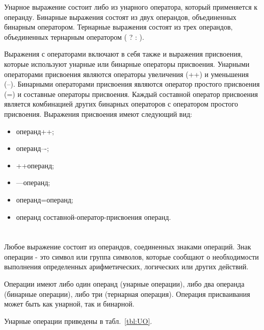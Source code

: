 Унарное выражение состоит либо из унарного оператора, который применяется к операнду. Бинарные выражения состоят из двух операндов, объединенных бинарным оператором. Тернарные выражения состоят из трех операндов, объединенных тернарным оператором ( ? : ).\killoverfullbefore

Выражения с операторами включают в себя также и выражения присвоения, которые используют унарные или бинарные операторы присвоения. Унарными операторами присвоения являются операторы увеличения (++) и уменьшения (--). Бинарными операторами присвоения являются оператор простого присвоения (=) и составные операторы присвоения. Каждый составной оператор присвоения является комбинацией других бинарных операторов с оператором простого присвоения. Выражения присвоения имеют следующий вид: 
\begin{itemize}
\item операнд++;
\item операнд{--}{-};
\item ++операнд;
\item {--}{--}операнд;
\item операнд=операнд;
\item операнд составной-оператор-присвоения операнд.
\end{itemize}


\section{}

Любое выражение состоит из операндов, соединенных знаками операций. Знак операции - это символ или группа символов, которые сообщают о необходимости выполнения определенных арифметических, логических или других действий. 

Операции имеют либо один операнд (унарные операции), либо два операнда (бинарные операции), либо три (тернарная операция). Операция присваивания может быть как унарной, так и бинарной.\killoverfullbefore

Унарные операции приведены в табл.~\ref{tbl:UO}.

